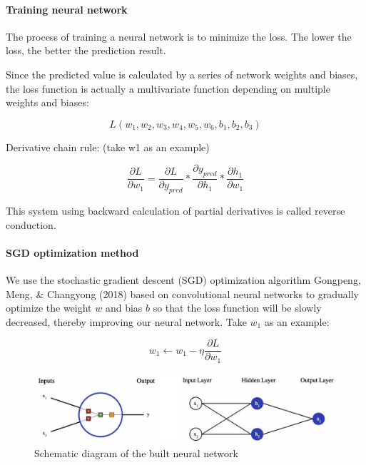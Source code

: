 \documentclass[12pt,a4paper,]{article}
\let\oldparagraph\paragraph
\renewcommand{\paragraph}[1]{\oldparagraph{#1}\mbox{}}
\begin{document}
\hypertarget{training-neural-network}{%
\paragraph{Training neural network}\label{training-neural-network}}

The process of training a neural network is to minimize the loss. The
lower the loss, the better the prediction result.

Since the predicted value is calculated by a series of network weights
and biases, the loss function is actually a multivariate function
depending on multiple weights and biases:

\begin{equation}
L\left(w_{1}, w_{2}, w_{3}, w_{4}, w_{5}, w_{6}, b_{1}, b_{2}, b_{3}\right)
\end{equation}

Derivative chain rule: (take w1 as an example)

\begin{equation}
\frac{\partial L}{\partial w_{1}}=\frac{\partial L}{\partial y_{p r e d}} * \frac{\partial y_{p r e d}}{\partial h_{1}} * \frac{\partial h_{1}}{\partial w_{1}}
\end{equation}

This system using backward calculation of partial derivatives is called
reverse conduction.

\hypertarget{sgd-optimization-method}{%
\paragraph{SGD optimization method}\label{sgd-optimization-method}}

We use the stochastic gradient descent (SGD) optimization algorithm
Gongpeng, Meng, \& Changyong (2018) based on convolutional neural
networks to gradually optimize the weight \(w\) and bias \(b\) so that
the loss function will be slowly decreased, thereby improving our neural
network. Take \(w_1\) as an example:

\begin{equation}
w_{1} \leftarrow w_{1}-\eta \frac{\partial L}{\partial w_{1}}
\end{equation}

\begin{figure}

{\centering \includegraphics[width=0.8\linewidth]{Schematic diagram of the built neural network} 

}

\caption{Schematic diagram of the built neural network}\label{fig:unnamed-chunk-16}
\end{figure}
\end{document}
